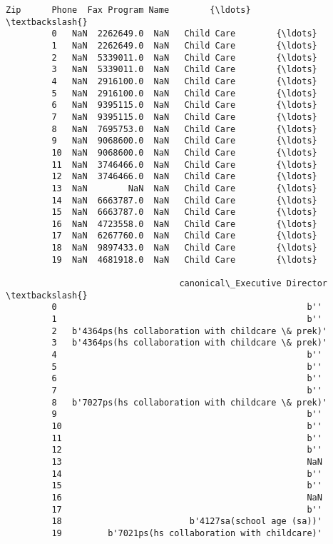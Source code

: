 \documentclass[11pt]{article}
\begin{document}
\begin{Verbatim}[commandchars=\\\{\}]
             Zip      Phone  Fax Program Name        {\ldots}          \textbackslash{}
         0   NaN  2262649.0  NaN   Child Care        {\ldots}           
         1   NaN  2262649.0  NaN   Child Care        {\ldots}           
         2   NaN  5339011.0  NaN   Child Care        {\ldots}           
         3   NaN  5339011.0  NaN   Child Care        {\ldots}           
         4   NaN  2916100.0  NaN   Child Care        {\ldots}           
         5   NaN  2916100.0  NaN   Child Care        {\ldots}           
         6   NaN  9395115.0  NaN   Child Care        {\ldots}           
         7   NaN  9395115.0  NaN   Child Care        {\ldots}           
         8   NaN  7695753.0  NaN   Child Care        {\ldots}           
         9   NaN  9068600.0  NaN   Child Care        {\ldots}           
         10  NaN  9068600.0  NaN   Child Care        {\ldots}           
         11  NaN  3746466.0  NaN   Child Care        {\ldots}           
         12  NaN  3746466.0  NaN   Child Care        {\ldots}           
         13  NaN        NaN  NaN   Child Care        {\ldots}           
         14  NaN  6663787.0  NaN   Child Care        {\ldots}           
         15  NaN  6663787.0  NaN   Child Care        {\ldots}           
         16  NaN  4723558.0  NaN   Child Care        {\ldots}           
         17  NaN  6267760.0  NaN   Child Care        {\ldots}           
         18  NaN  9897433.0  NaN   Child Care        {\ldots}           
         19  NaN  4681918.0  NaN   Child Care        {\ldots}           
         
                                  canonical\_Executive Director  \textbackslash{}
         0                                                 b''   
         1                                                 b''   
         2   b'4364ps(hs collaboration with childcare \& prek)'   
         3   b'4364ps(hs collaboration with childcare \& prek)'   
         4                                                 b''   
         5                                                 b''   
         6                                                 b''   
         7                                                 b''   
         8   b'7027ps(hs collaboration with childcare \& prek)'   
         9                                                 b''   
         10                                                b''   
         11                                                b''   
         12                                                b''   
         13                                                NaN   
         14                                                b''   
         15                                                b''   
         16                                                NaN   
         17                                                b''   
         18                         b'4127sa(school age (sa))'   
         19         b'7021ps(hs collaboration with childcare)'   
         

\end{Verbatim}
\end{document}
